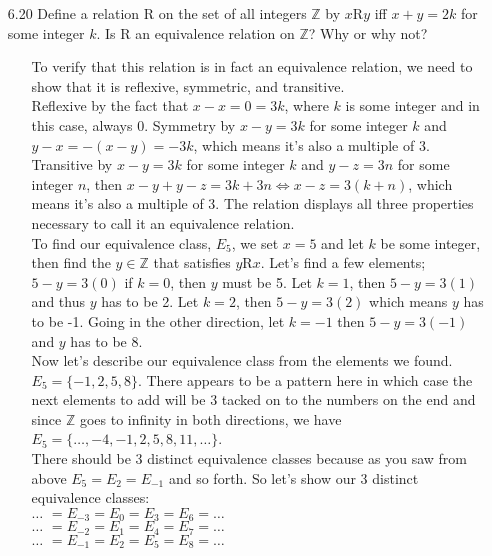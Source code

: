 \documentclass[12pt]{article}
\begin{document}
\begin{enumerate}
\item[6.20] Define a relation {\large R} on the set of all integers $\mathbb{Z}$ by $x${\large R}$y$ iff $x + y = 2k$ for some integer $k$. Is {\large R} an equivalence relation on $\mathbb{Z}$? Why or why not?
\begin{enumerate}
\item[] To verify that this relation is in fact an equivalence relation, we need to show that it is reflexive,
symmetric, and transitive. \\
Reflexive by the fact that $x - x = 0 = 3k$, where $k$ is some integer and in this case, always $0$.
Symmetry by $x - y = 3k$ for some integer $k$ and $y - x = -(x - y) = -3k$, which means it's also a multiple of 3.
Transitive by $x - y = 3k$ for some integer $k$ and $y - z = 3n$ for some integer $n$, then 
$x - y + y - z = 3k + 3n \Leftrightarrow x - z = 3(k + n)$, which means it's also a multiple of 3. 
The relation displays all three properties necessary to call it an equivalence relation. \\
To find our equivalence class, $E_5$, we set $x = 5$ and let $k$ be some integer, then find the $y \in \mathbb{Z}$ that
satisfies $y${\large R}$x$. Let's find a few elements; $5 - y = 3(0)$ if $k = 0$, then $y$ must be 5. Let $k = 1$, then
$5 - y = 3(1)$ and thus $y$ has to be 2. Let $k = 2$, then $5 - y = 3(2)$ which means $y$ has to be -1.
Going in the other direction, let $k = -1$ then $5 - y = 3(-1)$ and $y$ has
to be 8. \\
Now let's describe our equivalence class from the elements we found. $E_5 = \{-1, 2, 5, 8\}$. There appears to be 
a pattern here in which case the next elements to add will be 3 tacked on to the numbers on the end and since 
$\mathbb{Z}$ goes to infinity in both directions, we have $E_5 = \{\ldots, -4, -1, 2, 5, 8, 11,\ldots \}$. \\
There should be 3 distinct equivalence classes because as you saw from above $E_5 = E_2 = E_{-1}$ and so forth.
So let's show our 3 distinct equivalence classes: \\
$\ldots \,\,= E_{-3} = E_0 = E_3 = E_6 = \ldots$ \\
$\ldots \,\,= E_{-2} = E_1 = E_4 = E_7 = \ldots$ \\
$\ldots \,\,= E_{-1} = E_2 = E_5 = E_8 = \ldots$ 
\end{enumerate}


\end{enumerate}
\end{document}
